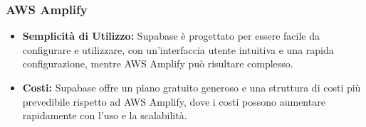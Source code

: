 \subsubsection{AWS Amplify}
\begin{itemize}
    \item \textbf{Semplicità di Utilizzo:} Supabase è progettato per essere facile da configurare e utilizzare, con un'interfaccia utente intuitiva e una rapida configurazione, mentre AWS Amplify può risultare complesso.
    \item \textbf{Costi:} Supabase offre un piano gratuito generoso e una struttura di costi più prevedibile rispetto ad AWS Amplify, dove i costi possono aumentare rapidamente con l'uso e la scalabilità.
\end{itemize}

